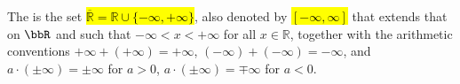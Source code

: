 \begin{definition} \label{definition:extended_real_line}
    The  is the set \hl{$\overline{\mathbb{R}} = \mathbb{R} \cup \{-\infty, +\infty\}$}, also denoted by \hl{$[-\infty, \infty]$}  that extends that on $\bbR$ and such that $-\infty < x < +\infty$ for all $x \in \mathbb{R}$, together with the arithmetic conventions $+\infty + (+\infty) = +\infty$, $(-\infty) + (-\infty) = -\infty$, and $a \cdot (\pm\infty) = \pm\infty$ for $a > 0$, $a \cdot (\pm\infty) = \mp\infty$ for $a < 0$.
\end{definition}